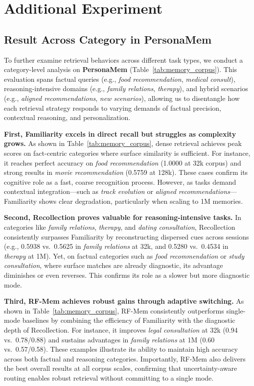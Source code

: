 \section{Additional Experiment}
\label{app:add_exp}

\subsection{Result Across Category in PersonaMem}
To further examine retrieval behaviors across different task types, we conduct a category-level analysis on \textbf{PersonaMem} (Table~\ref{tab:memory_corpus}). 
This evaluation spans factual queries (e.g., \emph{food recommendation}, \emph{medical consult}),  reasoning-intensive domains (e.g., \emph{family relations}, \emph{therapy}),  and hybrid scenarios (e.g., \emph{aligned recommendations}, \emph{new scenarios}), allowing us to disentangle how each retrieval strategy responds to varying demands of factual precision, contextual reasoning, and personalization. 

\textbf{First, Familiarity excels in direct recall but struggles as complexity grows.}  
As shown in Table~\ref{tab:memory_corpus}, dense retrieval achieves peak scores on fact-centric categories where surface similarity is sufficient. For instance, it reaches perfect accuracy on \emph{food recommendation} (1.0000 at 32k corpus) and strong results in \emph{movie recommendation} (0.5759 at 128k). These cases confirm its cognitive role as a fast, coarse recognition process. However, as tasks demand contextual integration—such as \emph{track evolution} or \emph{aligned recommendations}—Familiarity shows clear degradation, particularly when scaling to 1M memories.  

\textbf{Second, Recollection proves valuable for reasoning-intensive tasks.}  
In categories like \emph{family relations}, \emph{therapy}, and \emph{dating consultation}, Recollection consistently surpasses Familiarity by reconstructing dispersed cues across sessions (e.g., 0.5938 vs.\ 0.5625 in \emph{family relations} at 32k, and 0.5280 vs.\ 0.4534 in \emph{therapy} at 1M). Yet, on factual categories such as \emph{food recommendation} or \emph{study consultation}, where surface matches are already diagnostic, its advantage diminishes or even reverses. This confirms its role as a slower but more diagnostic mode.  

\textbf{Third, RF-Mem achieves robust gains through adaptive switching.}  
As shown in Table~\ref{tab:memory_corpus}, RF-Mem consistently outperforms single-mode baselines by combining the efficiency of Familiarity with the diagnostic depth of Recollection. For instance, it improves \emph{legal consultation} at 32k (0.94 vs.\ 0.78/0.88) and sustains advantages in \emph{family relations} at 1M (0.60 vs.\ 0.57/0.58). These examples illustrate its ability to maintain high accuracy across both factual and reasoning categories. Importantly, RF-Mem also delivers the best overall results at all corpus scales, confirming that uncertainty-aware routing enables robust retrieval without committing to a single mode.    

